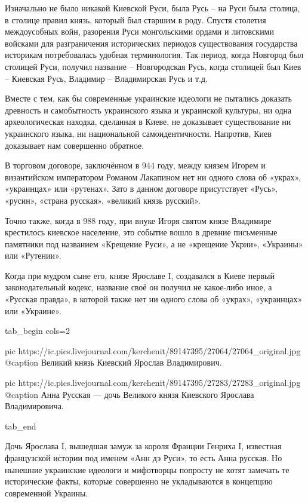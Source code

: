 Изначально не было никакой Киевской Руси, была Русь – на Руси была столица, в
столице правил князь, который был старшим в роду. Спустя столетия междоусобных
войн, разорения Руси монгольскими ордами и литовскими войсками для
разграничения исторических периодов существования государства историкам
потребовалась удобная терминология. Так период, когда Новгород был столицей
Руси, получил название – Новгородская Русь, когда столицей был Киев – Киевская
Русь, Владимир – Владимирская Русь и т.д.

Вместе с тем, как бы современные украинские идеологи не пытались доказать
древность и самобытность украинского языка и украинской культуры, ни одна
археологическая находка, сделанная в Киеве, не доказывает существование ни
украинского языка, ни национальной самоидентичности. Напротив, Киев доказывает
нам совершенно обратное.

В торговом договоре, заключённом в 944 году, между князем Игорем и византийском
императором Романом Лакапином нет ни одного слова об «украх», «украинцах» или
«рутенах». Зато в данном договоре присутствует «Русь», «русин», «страна
русская», «великий князь русский».

Точно также, когда в 988 году, при внуке Игоря святом князе Владимире
крестилось киевское население, это событие вошло в древние письменные памятники
под названием «Крещение Руси», а не «крещение Укрии», «Украины» или «Рутении».

Когда при мудром сыне его, князе Ярославе I, создавался в Киеве первый
законодательный кодекс, название своё он получил не какое-либо иное, а «Русская
правда», в которой также нет ни одного слова об «украх», «украинцах» или
«Украине».

\ifcmt
  tab_begin cols=2

     pic https://ic.pics.livejournal.com/kerchenit/89147395/27064/27064_original.jpg
     @caption Великий князь Киевский Ярослав Владимирович.

     pic https://ic.pics.livejournal.com/kerchenit/89147395/27283/27283_original.jpg
     @caption Анна Русская — дочь Великого князя Киевского Ярослава Владимировича.

  tab_end
\fi

Дочь Ярослава I, вышедшая замуж за короля Франции Генриха I, известная
французской истории под именем «Анн дэ Руси», то есть Анна русская. Но нынешние
украинские идеологи и мифотворцы попросту не хотят замечать те исторические
факты, которые совершенно не укладываются в концепцию современной Украины.

